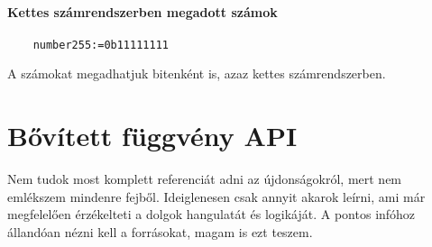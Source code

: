 \paragraph{Kettes számrendszerben megadott számok}
\begin{verbatim}
    number255:=0b11111111
\end{verbatim}
A számokat megadhatjuk bitenként is, azaz kettes számrendszerben.

\section{Bővített függvény API}

Nem tudok most komplett referenciát adni az újdonságokról,
mert nem emlékszem mindenre fejből. Ideiglenesen csak annyit akarok 
leírni, ami már megfelelően érzékelteti a dolgok hangulatát és logikáját.
A pontos infóhoz állandóan nézni kell a forrásokat, magam is ezt teszem.


